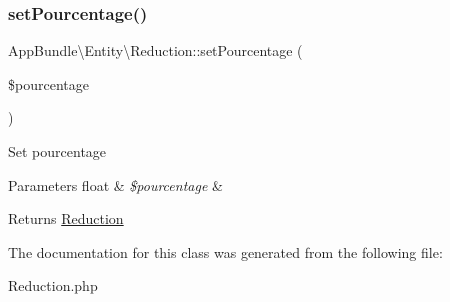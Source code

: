 \subsubsection{\texorpdfstring{set\+Pourcentage()}{setPourcentage()}}
{\footnotesize\ttfamily App\+Bundle\textbackslash{}\+Entity\textbackslash{}\+Reduction\+::set\+Pourcentage (\begin{DoxyParamCaption}\item[{}]{\$pourcentage }\end{DoxyParamCaption})}

Set pourcentage


\begin{DoxyParams}[1]{Parameters}
float & {\em \$pourcentage} & \\
\hline
\end{DoxyParams}
\begin{DoxyReturn}{Returns}
\hyperlink{class_app_bundle_1_1_entity_1_1_reduction}{Reduction} 
\end{DoxyReturn}


The documentation for this class was generated from the following file\+:\begin{DoxyCompactItemize}
\item 
Reduction.\+php\end{DoxyCompactItemize}
